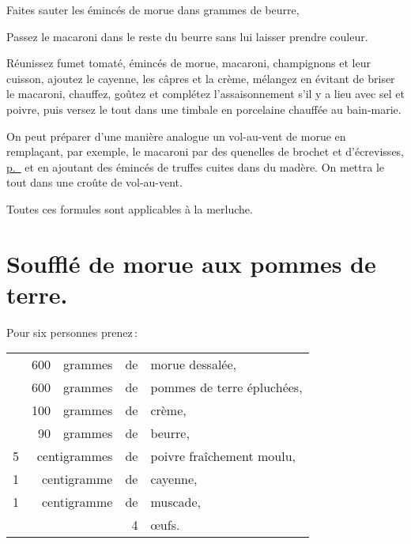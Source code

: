 Faites sauter les émincés de morue dans {\mmm} grammes de beurre,

Passez le macaroni dans le reste du beurre sans lui laisser prendre couleur.

Réunissez fumet tomaté, émincés de morue, macaroni, champignons et leur
cuisson, ajoutez le cayenne, les câpres et la crème, mélangez en évitant de
briser le macaroni, chauffez, goûtez et complétez l'assaisonnement s'il
y a lieu avec sel et poivre, puis versez le tout dans une timbale en porcelaine
chauffée au bain-marie.

\sk

On peut préparer d’une manière analogue un vol-au-vent de morue en remplaçant,
par exemple, le macaroni par des quenelles de brochet et d'écrevisses,
\hyperlink{p0328}{p. \pageref{pg0328}} et en ajoutant des émincés de truffes
cuites dans du madère. On mettra le tout dans une croûte de vol-au-vent.

\sk

Toutes ces formules sont applicables à la merluche.

\section*{\centering Soufflé de morue aux pommes de terre.}

Pour six personnes prenez :

\medskip

\footnotesize
\begin{longtable}{rrrrp{16em}}
  &  600 & grammes & de & morue dessalée,                                                                 \\
  &  600 & grammes & de & pommes de terre épluchées,                                                      \\
  &  100 & grammes & de & crème,                                                                          \\
  &   90 & grammes & de & beurre,                                                                         \\
5 & \multicolumn{2}{r}{centigrammes} & de & poivre fraîchement moulu,                                     \\
1 & \multicolumn{2}{r}{centigramme}  & de & cayenne,                                                      \\
1 & \multicolumn{2}{r}{centigramme}  & de & muscade,                                                      \\
  &      &         &  4 & œufs.                                                                           \\
\end{longtable}
\normalsize

